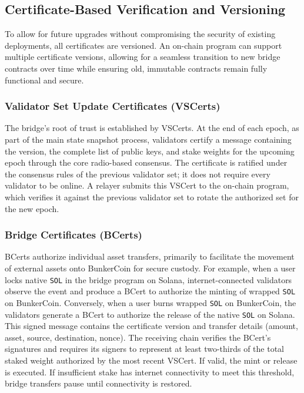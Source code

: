 \documentclass{article}
\begin{document}
\subsection{Certificate-Based Verification and Versioning}
To allow for future upgrades without compromising the security of existing deployments, all certificates are versioned. An on-chain program can support multiple certificate versions, allowing for a seamless transition to new bridge contracts over time while ensuring old, immutable contracts remain fully functional and secure.

\subsubsection{Validator Set Update Certificates (VSCerts)}
The bridge's root of trust is established by VSCerts. At the end of each epoch, as part of the main state snapshot process, validators certify a message containing the version, the complete list of public keys, and stake weights for the upcoming epoch through the core radio-based consensus. The certificate is ratified under the consensus rules of the previous validator set; it does not require every validator to be online. A relayer submits this VSCert to the on-chain program, which verifies it against the previous validator set to rotate the authorized set for the new epoch.

\subsubsection{Bridge Certificates (BCerts)}
BCerts authorize individual asset transfers, primarily to facilitate the movement of external assets onto BunkerCoin for secure custody. For example, when a user locks native \texttt{SOL} in the bridge program on Solana, internet-connected validators observe the event and produce a BCert to authorize the minting of wrapped \texttt{SOL} on BunkerCoin. Conversely, when a user burns wrapped \texttt{SOL} on BunkerCoin, the validators generate a BCert to authorize the release of the native \texttt{SOL} on Solana. This signed message contains the certificate version and transfer details (amount, asset, source, destination, nonce). The receiving chain verifies the BCert's signatures and requires its signers to represent at least two-thirds of the total staked weight authorized by the most recent VSCert. If valid, the mint or release is executed. If insufficient stake has internet connectivity to meet this threshold, bridge transfers pause until connectivity is restored.
\end{document}

